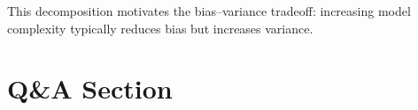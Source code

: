 \documentclass{article}
\begin{document}
This decomposition motivates the bias–variance tradeoff: increasing model complexity typically reduces bias but increases variance.






\section{Q\&A Section}
\end{document}
